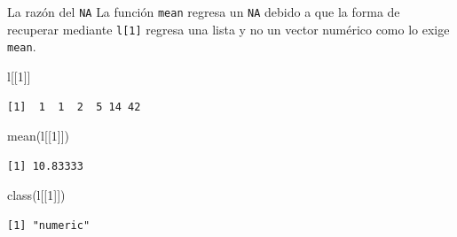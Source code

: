 \documentclass[
  ignorenonframetext,
  aspectratio=169,
  spanish,
]{beamer}
\newenvironment{Shaded}{\begin{snugshade}}{\end{snugshade}}
\newcommand{\DecValTok}[1]{\textcolor[rgb]{0.68,0.00,0.00}{#1}}
\newcommand{\FunctionTok}[1]{\textcolor[rgb]{0.28,0.35,0.67}{#1}}
\newcommand{\NormalTok}[1]{\textcolor[rgb]{0.00,0.23,0.31}{#1}}
\begin{document}
\begin{frame}[fragile]{La razón del \texttt{NA}}
\label{la-razuxf3n-del-na}
La función \texttt{mean} regresa un \texttt{NA} debido a que la forma de
recuperar mediante \texttt{l{[}1{]}} regresa una lista y no un vector
numérico como lo exige \texttt{mean}.

\begin{Shaded}
\begin{Highlighting}[]
\NormalTok{l[[}\DecValTok{1}\NormalTok{]]}
\end{Highlighting}
\end{Shaded}

\begin{verbatim}
[1]  1  1  2  5 14 42
\end{verbatim}

\begin{Shaded}
\begin{Highlighting}[]
\FunctionTok{mean}\NormalTok{(l[[}\DecValTok{1}\NormalTok{]])}
\end{Highlighting}
\end{Shaded}

\begin{verbatim}
[1] 10.83333
\end{verbatim}

\begin{Shaded}
\begin{Highlighting}[]
\FunctionTok{class}\NormalTok{(l[[}\DecValTok{1}\NormalTok{]]) }
\end{Highlighting}
\end{Shaded}

\begin{verbatim}
[1] "numeric"
\end{verbatim}
\end{frame}
\end{document}
